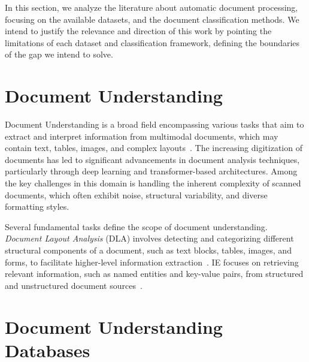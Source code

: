 In this section, we analyze the literature about automatic document processing, focusing on the available datasets, and the document classification methods. We intend to justify the relevance and direction of this work by pointing the limitations of each dataset and classification framework, defining the boundaries of the gap we intend to solve.

\section{Document Understanding}

Document Understanding is a broad field encompassing various tasks that aim to extract and interpret information from multimodal documents, which may contain text, tables, images, and complex layouts~\cite{formUnderstandingSurvey}. The increasing digitization of documents has led to significant advancements in document analysis techniques, particularly through deep learning and transformer-based architectures. Among the key challenges in this domain is handling the inherent complexity of scanned documents, which often exhibit noise, structural variability, and diverse formatting styles.

Several fundamental tasks define the scope of document understanding. \textit{Document Layout Analysis} (DLA) involves detecting and categorizing different structural components of a document, such as text blocks, tables, images, and forms, to facilitate higher-level information extraction~\cite{zhong2019publaynet}. \gls{IE} focuses on retrieving relevant information, such as named entities and key-value pairs, from structured and unstructured document sources~\cite{formUnderstandingSurvey}. 


\section{Document Understanding Databases}

